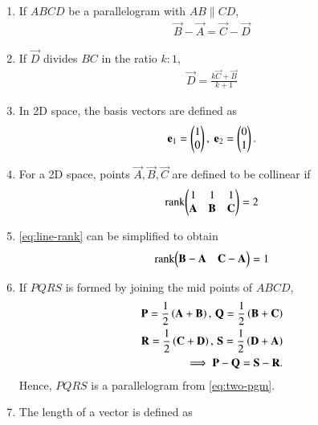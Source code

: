 \begin{enumerate}[label=\thesubsection.\arabic*.,ref=\thesubsection.\theenumi]
  \item If $ABCD$ be a parallelogram with $AB \parallel CD$,
	  \label{prop:two-pgm}
  \begin{align}
	  \label{eq:two-pgm}
 \vec{B}-\vec{A} = \vec{C} -\vec{D}
  \end{align}
\item If $\vec{D}$ divides $BC$ in the ratio $k : 1$,
		\begin{align}
			\vec{D}= \frac{k\vec{C}+\vec{B}}{k+1}
	  \label{eq:section_formula}
		\end{align}
	\item In 2D space,  the basis vectors are defined as 
\begin{align}
	\mathbf{e}_1 = \begin{pmatrix}1 \\ 0\end{pmatrix},\
	\mathbf{e}_2 = \begin{pmatrix}0 \\ 1\end{pmatrix}.
\end{align}
\item   For a 2D space, 
	points $\vec{A}, \vec{B}, \vec{C}$ are defined to be collinear if 
		\begin{align}
			\label{eq:line-rank}
			\text{rank}{\ensuremath{\begin{pmatrix}1 & 1 & 1 \\ \mathbf{A}& \mathbf{B}&\mathbf{C}\end{pmatrix}}} = 2
		\end{align}
	\item 
			\eqref{eq:line-rank}
			can be simplified to obtain
		\begin{align}
			\label{eq:line-rank-2}
			\text{rank}{\ensuremath{\begin{pmatrix}\mathbf{B}-\mathbf{A}& \mathbf{C}-\mathbf{A}\end{pmatrix}}} = 1
		\end{align}
  \item 
If $PQRS$ is formed by joining the mid points of $ABCD$, 
\begin{align}
  \mathbf{P} = \frac{1}{2}\left(\mathbf{A}+\mathbf{B}\right) 
  ,\,
 \mathbf{Q} = \frac{1}{2}\left(\mathbf{B}+\mathbf{C}\right) 
 \\
 \mathbf{R} = \frac{1}{2}\left(\mathbf{C}+\mathbf{D}\right)   
  ,\,
 \mathbf{S} = \frac{1}{2}\left(\mathbf{D}+\mathbf{A}\right)  
 \\
	\implies 
 \mathbf{P}-\mathbf{Q} = \mathbf{S} -\mathbf{R}.
  \label{eq:10/7/4/8det2f}
\end{align}
Hence, $PQRS$ is a parallelogram
	  from \eqref{eq:two-pgm}.
	\item The length of a vector  is  defined as
		\begin{align}
		\label{eq:side-length}

\end{align}
\end{enumerate}
